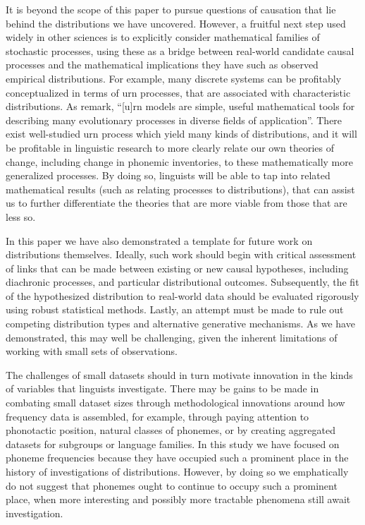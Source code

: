 It is beyond the scope of this paper to pursue questions of causation that lie behind the distributions we have uncovered. However, a fruitful next step used widely in other sciences is to explicitly consider mathematical families of stochastic processes, using these as a bridge between real-world candidate causal processes and the mathematical implications they have such as observed empirical distributions. For example, many discrete systems can be profitably conceptualized in terms of urn processes, that are associated with characteristic distributions. As \textcite[p.~87]{kuba2012limiting} remark, ``{[}u{]}rn models are simple, useful mathematical tools for describing many evolutionary processes in diverse fields of application''. There exist well-studied urn process which yield many kinds of distributions, and it will be profitable in linguistic research to more clearly relate our own theories of change, including change in phonemic inventories, to these mathematically more generalized processes. By doing so, linguists will be able to tap into related mathematical results (such as relating processes to distributions), that can assist us to further differentiate the theories that are more viable from those that are less so.

In this paper we have also demonstrated a template for future work on distributions themselves. Ideally, such work should begin with critical assessment of links that can be made between existing or new causal hypotheses, including diachronic processes, and particular distributional outcomes. Subsequently, the fit of the hypothesized distribution to real-world data should be evaluated rigorously using robust statistical methods. Lastly, an attempt must be made to rule out competing distribution types and alternative generative mechanisms. As we have demonstrated, this may well be challenging, given the inherent limitations of working with small sets of observations.

The challenges of small datasets should in turn motivate innovation in the kinds of variables that linguists investigate. There may be gains to be made in combating small dataset sizes through methodological innovations around how frequency data is assembled, for example, through paying attention to phonotactic position, natural classes of phonemes, or by creating aggregated datasets for subgroups or language families. In this study we have focused on phoneme frequencies because they have occupied such a prominent place in the history of investigations of distributions. However, by doing so we emphatically do not suggest that phonemes ought to continue to occupy such a prominent place, when more interesting and possibly more tractable phenomena still await investigation.

